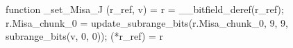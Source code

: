 function _set_Misa_J (r_ref, v) = {
    r = __bitfield_deref(r_ref);
    r.Misa_chunk_0 = update_subrange_bits(r.Misa_chunk_0, 9, 9, subrange_bits(v, 0, 0));
    (*r_ref) = r
}
